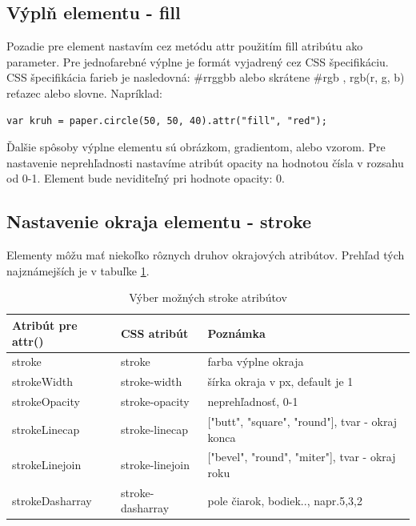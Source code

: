 \subsection{Výplň elementu - fill }

Pozadie pre element nastavím cez metódu attr použitím fill atribútu ako parameter. Pre jednofarebné výplne je formát vyjadrený cez CSS špecifikáciu. CSS špecifikácia farieb je nasledovná: \#rrggbb alebo skrátene \#rgb , rgb(r, g, b) reťazec alebo slovne. 
Napríklad: 
\begin{lstlisting}
var kruh = paper.circle(50, 50, 40).attr("fill", "red");
\end{lstlisting}

Ďalšie spôsoby výplne elementu sú obrázkom,  gradientom, alebo vzorom. 
Pre nastavenie neprehľadnosti nastavíme atribút opacity na hodnotou čísla v rozsahu od 0-1. Element bude neviditeľný pri hodnote opacity: 0. 
 

\subsection{Nastavenie okraja elementu - stroke}

Elementy môžu mať niekoľko rôznych druhov okrajových atribútov. Prehľad tých najznámejších je v tabuľke \ref{parametre:styl}.\cite{styly}


\begin{table}[H]
	\begin{center}
		
		\begin{tabular}{|l|l|l|}
			\hline \textbf{Atribút pre attr() } &\textbf{CSS atribút} & \textbf{Poznámka} \\  \hline 			
			\hline stroke & stroke & farba výplne okraja \\ 
			\hline strokeWidth & stroke-width & šírka okraja v px, default je 1 \\ 
			\hline strokeOpacity & stroke-opacity & neprehľadnosť, 0-1 \\
			\hline strokeLinecap & stroke-linecap & ["butt", "square", "round"], tvar - okraj konca\\ 
			\hline strokeLinejoin & stroke-linejoin & ["bevel", "round", "miter"], tvar - okraj roku\\ 
			\hline strokeDasharray &stroke-dasharray & pole čiarok, bodiek.., napr.5,3,2\\
			\hline
		\end{tabular} 
	\end{center}
	\caption{Výber možných stroke atribútov}
	\label{parametre:styl}
\end{table}


